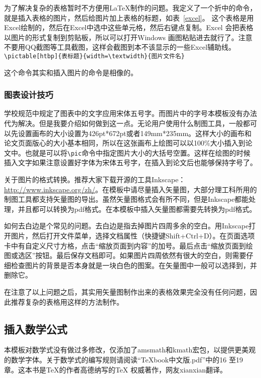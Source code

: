 为了解决复杂的表格暂时不方便用\LaTeX 制作的问题。我定义了一个折中的命令，就是插入表格的图片，然后给图片加上表格的标题，如表~\ref{excel}。 这个表格是用Excel绘制的，然后在Excel中选中这些单元格，然后右键点复制。Excel 会把表格以图片的形式复制到剪贴板，所以可以打开Windows 画图粘贴进去就行了。注意不要用QQ截图等工具截图，这样会截图到本不该显示的一些Excel辅助线。\\
\verb|\pictable[htbp]{表标题}{width=\textwidth}{图片文件名}|\par
这个命令其实和插入图片的命令是相像的。\par
{}
\subsubsection{图表设计技巧}\label{subsubsection:skill}
学校规范中规定了图表中的文字应用宋体五号字。而图片中的字号本模板没有办法代为解决。但是我要介绍如何做到这一点。无论用户使用什么制图工具，一般都可以先设置画布的大小设置为426pt*672pt或者149mm*235mm。这样大小的画布和论文页面版心的大小基本相同，所以在这张画布上绘图可以以100\%大小插入到论文中。也就是可以将\verb|\pic|命令中指定图片大小的大括号空置。这样在绘图的时候插入文字如果注意设置好字体为宋体五号字，在插入到论文后也能够保持字号了。

关于图片的格式转换。推荐大家下载开源的工具Inkscape：\url{http://www.inkscape.org/zh/}。在模板中请尽量插入矢量图，大部分理工科所用的制图工具都支持矢量图的导出。虽然矢量图格式会有所不同，但是Inkscape都能处理，并且都可以转换为pdf格式。在本模板中插入矢量图都需要先转换为pdf格式。

如何去白边是个常见的问题。去白边是指去掉图片四周多余的空白。用Inkscape打开图片，然后打开文件菜单，选择文档属性（快捷键Shift+Ctrl+D）。在页面选项卡中有自定义尺寸方格，点击“缩放页面到内容”的加号。最后点击“缩放页面到绘图或选区”按钮。最后保存文档即可。如果图片四周依然有很大的空白，则需要仔细检查图片的背景是否本身就是一块白色的图案。在矢量图中一般可以选择到，并删除它。

在注意了以上问题之后，其实用矢量图制作出来的表格效果完全没有任何问题，因此推荐复杂的表格用这样的方法制作。
\subsection{插入数学公式}
本模板对数学式没有做过多修改，仅添加了amsmath和kmath宏包，以提供更美观的数学字体。关于数学式的编写规则请阅读“TeXbook中文版.pdf”中的16 至19 章。这本书是\TeX{}的作者高德纳写的\TeX{} 权威著作，网友xianxian翻译。

